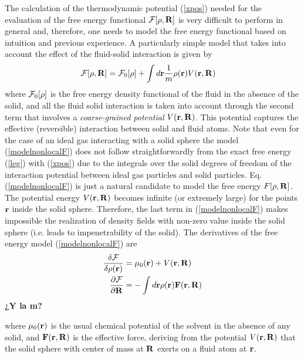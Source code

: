 \documentclass[b5paper,openright,11pt]{book}
\newcommand{\Note}[1]{{\bf \color{red}#1}}    %
\begin{document}
The calculation of the thermodynamic potential (\ref{xpos}) needed for
the evaluation of the free  energy functional ${\cal F}[\rho,{\bf R}]$
is very difficult  to perform in general and,  therefore, one needs to  model the
free energy functional based on intuition and previous experience. A
particularly simple model that takes into account the effect of the
fluid-solid interaction is given by
\begin{align}
  {\cal F}[\rho,{\bf R}]&={\cal F}_0[\rho]
+\int d{\bf r}\frac{1}{m}
\rho({\bf r})V({\bf r},{\bf R})
\label{modelnonlocalF}
\end{align}
where ${\cal F}_0[\rho]$ is the  free energy density functional of the
fluid in the absence of the solid, and all the fluid solid interaction
is  taken  into  account  through  the second  term  that  involves  a
\textit{coarse-grained   potential}   $V({\bf  r},{\bf   R})$.    This
potential  captures  the  effective (reversible)  interaction  between
solid and fluid atoms.  Note  that even for the case of
  an   ideal  gas   interacting  with   a  solid   sphere  the   model
  (\ref{modelnonlocalF})  does not  follow  straightforwardly from  the
  exact free energy (\ref{leg}) with (\ref{xpos}) due to the integrals
  over  the solid  degrees  of freedom  of  the interaction  potential
  between    ideal     gas    particles    and     solid    particles.
  Eq. (\ref{modelnonlocalF}) is just a natural  candidate to model the free
  energy $F[\rho,{\bf R}]$. The potential energy $V({\bf r},{\bf R})$
becomes infinite (or extremely large)  for the points ${\bf r}$ inside
the solid  sphere. Therefore, the last  term in (\ref{modelnonlocalF})
makes impossible the realization of density fields with non-zero value
inside the solid sphere (i.e.  leads to impenetrability of the solid).
The derivatives of the free energy model (\ref{modelnonlocalF}) are
\begin{align}
  \frac{\delta{\cal F}}{\delta\rho({\bf r})}&=\mu_0({\bf r})+V({\bf r},{\bf R})
\nonumber\\
\frac{\partial{\cal F}}{\partial{\bf R}}&=-\int d{\bf r}\rho({\bf r}){\bf F}({\bf r},{\bf R})
\end{align}
\Note{¿Y la m?}

where $\mu_0({\bf r})$ is the  usual chemical potential of the solvent
in the  absence of any  solid, and ${\bf  F}({\bf r},{\bf R})$  is the
effective force, deriving from the potential $V({\bf r},{\bf R})$ that
the solid sphere  with center of mass  at ${\bf R}$ exerts  on a fluid
atom at ${\bf r}$.
\end{document}
